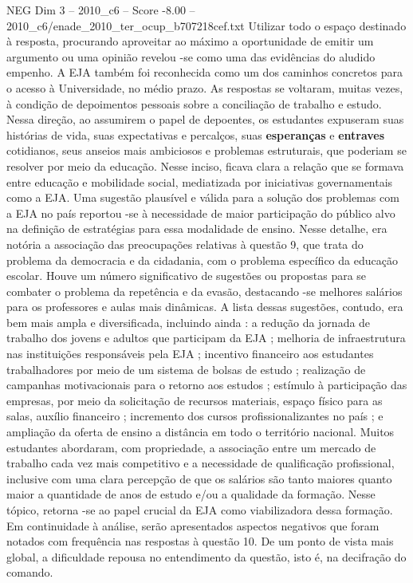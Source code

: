 \begin{textsample}{NEG Dim 3 – 2010\_c6 – Score -8.00 – 2010\_c6/enade\_2010\_ter\_ocup\_b707218cef.txt}
Utilizar todo o espaço destinado à resposta, procurando aproveitar ao máximo a oportunidade de emitir um argumento ou uma opinião revelou -se como uma das evidências do aludido empenho.
A EJA também foi reconhecida como um dos caminhos concretos para o acesso à Universidade, no médio prazo.
As respostas se voltaram, muitas vezes, à condição de depoimentos pessoais sobre a conciliação de trabalho e estudo.
Nessa direção, ao assumirem o papel de depoentes, os estudantes expuseram suas histórias de vida, suas expectativas e percalços, suas \textbf{esperanças} e \textbf{entraves} cotidianos, seus anseios mais ambiciosos e problemas estruturais, que poderiam se resolver por meio da educação.
Nesse inciso, ficava clara a relação que se formava entre educação e mobilidade social, mediatizada por iniciativas governamentais como a EJA.
Uma sugestão plausível e válida para a solução dos problemas com a EJA no país reportou -se à necessidade de maior participação do público alvo na definição de estratégias para essa modalidade de ensino.
Nesse detalhe, era notória a associação das preocupações relativas à questão 9, que trata do problema da democracia e da cidadania, com o problema específico da educação escolar.
Houve um número significativo de sugestões ou propostas para se combater o problema da repetência e da evasão, destacando -se melhores salários para os professores e aulas mais dinâmicas.
A lista dessas sugestões, contudo, era bem mais ampla e diversificada, incluindo ainda : a redução da jornada de trabalho dos jovens e adultos que participam da EJA ; melhoria de infraestrutura nas instituições responsáveis pela EJA ; incentivo financeiro aos estudantes trabalhadores por meio de um sistema de bolsas de estudo ; realização de campanhas motivacionais para o retorno aos estudos ; estímulo à participação das empresas, por meio da solicitação de recursos materiais, espaço físico para as salas, auxílio financeiro ; incremento dos cursos profissionalizantes no país ; e ampliação da oferta de ensino a distância em todo o território nacional.
Muitos estudantes abordaram, com propriedade, a associação entre um mercado de trabalho cada vez mais competitivo e a necessidade de qualificação profissional, inclusive com uma clara percepção de que os salários são tanto maiores quanto maior a quantidade de anos de estudo e/ou a qualidade da formação.
Nesse tópico, retorna -se ao papel crucial da EJA como viabilizadora dessa formação.
Em continuidade à análise, serão apresentados aspectos negativos que foram notados com frequência nas respostas à questão 10.
De um ponto de vista mais global, a dificuldade repousa no entendimento da questão, isto é, na decifração do comando.

\end{textsample}
